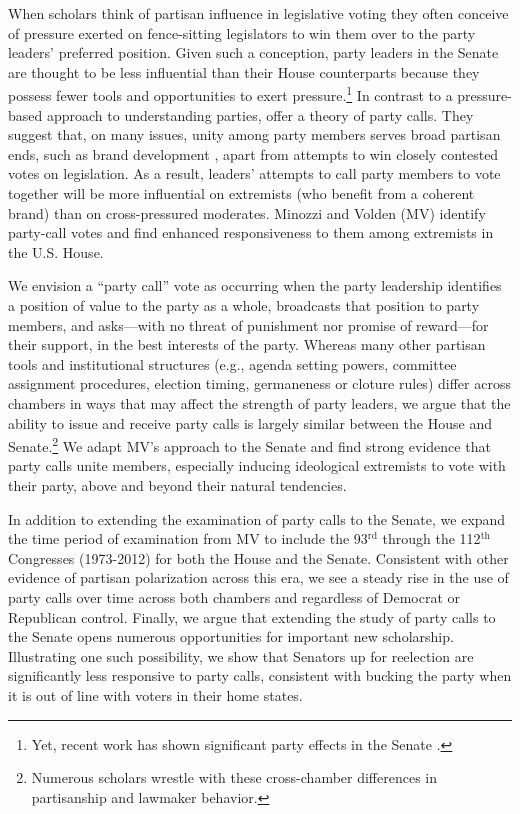 \documentclass[12pt]{article}
\begin{document}
\noindent When scholars think of partisan influence in legislative voting they often conceive of pressure exerted on fence-sitting legislators to win them over to the party leaders' preferred position.  Given such a conception, party leaders in the Senate are thought to be less influential than their House counterparts because they possess fewer tools and opportunities to exert pressure.\footnote{\doublespacing\normalsize Yet, recent work has shown significant party effects in the Senate \citep[e.g.,][]{Gailmard:2007, Monroe:2008, Patty:2008, Volden:2006}.}  In contrast to a pressure-based approach to understanding parties, \cite{Minozzi:2013} offer a theory of party calls.  They suggest that, on many issues, unity among party members serves broad partisan ends, such as brand development \citep[e.g.,][]{Snyder:2002}, apart from attempts to win closely contested votes on legislation.  As a result, leaders' attempts to call party members to vote together will be more influential on extremists (who benefit from a coherent brand) than on cross-pressured moderates.  Minozzi and Volden (MV) identify party-call votes and find enhanced responsiveness to them among extremists in the U.S. House.

We envision a ``party call'' vote as occurring when the party leadership identifies a position of value to the party as a whole, broadcasts that position to party members, and asks---with no threat of punishment nor promise of reward---for their support, in the best interests of the party.  Whereas many other partisan tools and institutional structures (e.g., agenda setting powers, committee assignment procedures, election timing, germaneness or cloture rules) differ across chambers in ways that may affect the strength of party leaders, we argue that the ability to issue and receive party calls is largely similar between the House and Senate.\footnote{\doublespacing\normalsize Numerous scholars \citep[e.g.,][]{DenHartog:2011, Madonna:2011, Sinclair:2017, Smith:2007} wrestle with these cross-chamber differences in partisanship and lawmaker behavior.}   We adapt MV's approach to the Senate and find strong evidence that party calls unite members, especially inducing ideological extremists to vote with their party, above and beyond their natural tendencies.

In addition to extending the examination of party calls to the Senate, we expand the time period of examination from MV to include the 93$^{\text{rd}}$ through the 112$^{\text{th}}$ Congresses (1973-2012) for both the House and the Senate. Consistent with other evidence of partisan polarization across this era, we see a steady rise in the use of party calls over time across both chambers and regardless of Democrat or Republican control. Finally, we argue that extending the study of party calls to the Senate opens numerous opportunities for important new scholarship.  Illustrating one such possibility, we show that Senators up for reelection are significantly less responsive to party calls, consistent with bucking the party when it is out of line with voters in their home states.
\end{document}
